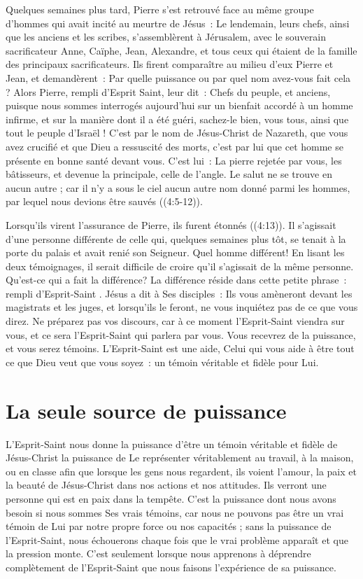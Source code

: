 Quelques semaines plus tard, Pierre s'est retrouvé face au même groupe
 d'hommes qui avait incité au meurtre de Jésus~:
 \og Le lendemain, leurs chefs, ainsi que les anciens et les scribes,
 s'assemblèrent à Jérusalem, avec le souverain sacrificateur Anne,
 Caïphe, Jean, Alexandre, et tous ceux qui étaient de la famille
 des principaux sacrificateurs. Ils firent comparaître au milieu d'eux
 Pierre et Jean, et demandèrent~: Par quelle puissance ou par quel nom
 avez-vous fait cela ? Alors Pierre, rempli d'Esprit Saint, leur dit~:
 Chefs du peuple, et anciens, puisque nous sommes interrogés aujourd'hui
 sur un bienfait accordé à un homme infirme, et sur la manière
 dont il a été guéri, sachez-le bien, vous tous, ainsi que tout le peuple
 d'Israël ! C'est par le nom de Jésus-Christ de Nazareth, que vous avez
 crucifié et que Dieu a ressuscité des morts, c'est par lui que cet homme
 se présente en bonne santé devant vous. C'est lui~: La pierre rejetée
 par vous, les bâtisseurs, et devenue la principale, celle de l'angle.
 Le salut ne se trouve en aucun autre ; car il n'y a sous le ciel aucun
 autre nom donné parmi les hommes, par lequel nous devions être
 sauvés \fg{} ((4:5-12)).

Lorsqu'ils virent l'assurance de Pierre, ils furent étonnés
 ((4:13)). Il s'agissait d'une personne différente
 de celle qui, quelques semaines plus tôt, se tenait à la porte du palais
 et avait renié son Seigneur. Quel homme différent!
 En lisant les deux témoignages, il serait difficile de croire
 qu'il s'agissait de la même personne. Qu'est-ce qui a fait la différence?
 La différence réside dans cette petite phrase~:
 \og rempli d'Esprit-Saint \fg{}. Jésus a dit à Ses disciples~:
 \og Ils vous amèneront devant les magistrats et les juges,
 et lorsqu'ils le feront, ne vous inquiétez pas de ce que vous direz.
 Ne préparez pas vos discours, car à ce moment l'Esprit-Saint viendra
 sur vous, et ce sera l'Esprit-Saint qui parlera par vous.
 Vous recevrez de la puissance, et vous serez témoins. \fg{}
 L'Esprit-Saint est une aide, Celui qui vous aide à être tout ce que Dieu
 veut que vous soyez~: un témoin véritable et fidèle pour Lui.


\section*{La seule source de puissance}

L'Esprit-Saint nous donne la puissance d'être un témoin véritable
 et fidèle de Jésus-Christ \ocadr la puissance de Le représenter
 véritablement au travail, à la maison, ou en classe \fcadr{}
 afin que lorsque les gens nous regardent, ils voient l'amour,
 la paix et la beauté de Jésus-Christ dans nos actions et nos attitudes.
 Ils verront une personne qui est en paix dans la tempête.
 C'est la puissance dont nous avons besoin si nous sommes Ses vrais témoins,
 car nous ne pouvons pas être un vrai témoin de Lui par notre propre force
 ou nos capacités ; sans la puissance de l'Esprit-Saint, nous échouerons
 chaque fois que le vrai problème apparaît et que la pression monte.
 C'est seulement lorsque nous apprenons à déprendre complètement
 de l'Esprit-Saint que nous faisons l'expérience de sa puissance.

